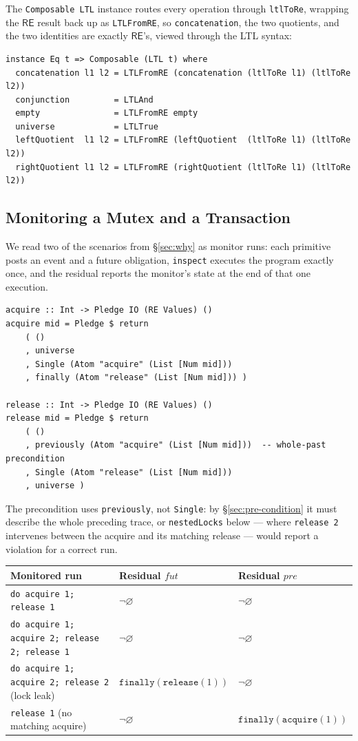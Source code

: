 \documentclass[acmsmall,screen]{acmart}
\newcommand{\RE}{\mathsf{RE}}
\newcommand{\pre}{\mathit{pre}}
\newcommand{\fut}{\mathit{fut}}
\newcommand{\finally}[1]{\mathtt{finally}(#1)}
\newcommand{\univ}{\neg\varnothing}
\begin{document}
The \lstinline{Composable LTL} instance routes every operation through
\lstinline{ltlToRe}, wrapping the $\RE$ result back up as
\lstinline{LTLFromRE}, so \lstinline{concatenation}, the two quotients, and
the two identities are exactly $\RE$'s, viewed through the LTL syntax:
\begin{lstlisting}
instance Eq t => Composable (LTL t) where
  concatenation l1 l2 = LTLFromRE (concatenation (ltlToRe l1) (ltlToRe l2))
  conjunction         = LTLAnd
  empty               = LTLFromRE empty
  universe            = LTLTrue
  leftQuotient  l1 l2 = LTLFromRE (leftQuotient  (ltlToRe l1) (ltlToRe l2))
  rightQuotient l1 l2 = LTLFromRE (rightQuotient (ltlToRe l1) (ltlToRe l2))
\end{lstlisting}

\subsection{Monitoring a Mutex and a Transaction}
\label{sec:ltl-examples}

We read two of the scenarios from \S\ref{sec:why} as monitor runs: each
primitive posts an event and a future obligation, \lstinline{inspect}
executes the program exactly once, and the residual reports the monitor's
state at the end of that one execution.

\begin{lstlisting}
acquire :: Int -> Pledge IO (RE Values) ()
acquire mid = Pledge $ return
    ( ()
    , universe
    , Single (Atom "acquire" (List [Num mid]))
    , finally (Atom "release" (List [Num mid])) )

release :: Int -> Pledge IO (RE Values) ()
release mid = Pledge $ return
    ( ()
    , previously (Atom "acquire" (List [Num mid]))  -- whole-past precondition
    , Single (Atom "release" (List [Num mid]))
    , universe )
\end{lstlisting}
The precondition uses \lstinline{previously}, not \lstinline{Single}: by
\S\ref{sec:pre-condition} it must describe the whole preceding trace, or
\lstinline{nestedLocks} below --- where \lstinline{release 2} intervenes
between the acquire and its matching release --- would report a violation
for a correct run.

\begin{center}
\begin{tabular}{lll}
\toprule
Monitored run & Residual $\fut$ & Residual $\pre$ \\
\midrule
\lstinline{do acquire 1; release 1}                     & $\univ$ & $\univ$ \\
\lstinline{do acquire 1; acquire 2; release 2; release 1} & $\univ$ & $\univ$ \\
\lstinline{do acquire 1; acquire 2; release 2} (lock leak) & $\finally{\mathtt{release}(1)}$ & $\univ$ \\
\lstinline{release 1} (no matching acquire)              & $\univ$ & $\finally{\mathtt{acquire}(1)}$ \\
\bottomrule
\end{tabular}
\end{center}
\end{document}
